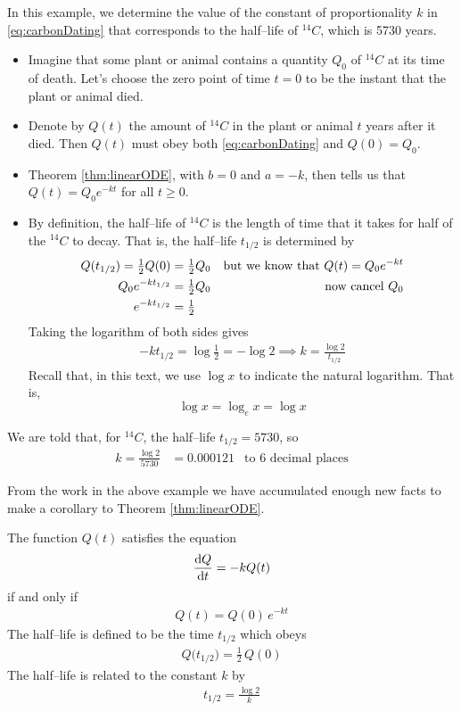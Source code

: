 \begin{eg}\label{eg:carbonDatingHalfLife}
In this example, we determine the value of the constant of proportionality
$k$ in \eqref{eq:carbonDating} that corresponds to the half--life
of ${}^{14}C$, which is 5730 years.
\begin{itemize}
\item Imagine that some plant or animal
contains a quantity $Q_0$ of ${}^{14}C$ at its time of death. Let's
choose the zero point of time $t=0$ to be the instant that the plant or
animal died.
\item
Denote by $Q(t)$ the amount of ${}^{14}C$ in the plant
or animal $t$ years after it died. Then $Q(t)$ must obey both
\eqref{eq:carbonDating} and $Q(0)=Q_0$.
\item
Theorem \ref{thm:linearODE}, with $b=0$ and $a=-k$, then tells us that
$Q(t) = Q_0 e^{-kt}$ for all $t\ge 0$.
\item
By definition, the half--life of ${}^{14}C$ is the length of time that it
takes for half of the ${}^{14}C$ to decay. That is, the half--life
$t_{1/2}$ is determined by
\begin{align*}
Q(t_{1/2})=\tfrac{1}{2} Q(0)&=\tfrac{1}{2} Q_0 &\text{but we know that $Q(t)=Q_0e^{-kt}$} \\
Q_0 e^{-kt_{1/2}}&=\tfrac{1}{2} Q_0&\text{now cancel $Q_0$} \\
e^{-kt_{1/2}}&=\tfrac{1}{2}
\end{align*}
Taking the logarithm of both sides gives
\begin{align*}
-k t_{1/2}=\log \frac{1}{2} = -\log 2
\implies k=\frac{\log 2}{t_{1/2}}
\end{align*}
Recall that, in this text, we use $\log x$ to indicate the natural
logarithm. That is,
\begin{equation*}
\log x = \log_e x=\log x
\end{equation*}
\end{itemize}
We are told that, for ${}^{14}C$, the half--life $t_{1/2}=5730$, so
\begin{align*}
k=\frac{\log 2}{5730} &= 0.000121 &\text{to $6$ decimal places}
\end{align*}
\end{eg}

From the work in the above example we have accumulated enough new facts to make
a corollary to Theorem \ref{thm:linearODE}.
\begin{cor}\label{cor:carbonDating}
The function $Q(t)$ satisfies the equation
\begin{align*}
\diff{Q}{t} = -k Q(t)
\end{align*}
if and only if
\begin{align*}
Q(t) = Q(0)\, e^{-kt}
\end{align*}
The half--life is defined to be the time $t_{1/2}$ which obeys
\begin{align*}
Q\big(t_{1/2}\big) = \frac{1}{2}\,Q(0)
\end{align*}
The half--life is related to the constant $k$ by
\begin{align*}
t_{1/2} =\frac{\log 2}{k}
\end{align*}
\end{cor}


